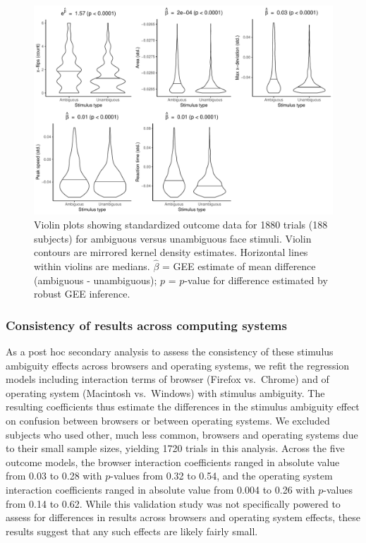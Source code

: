 \documentclass[]{article}
\begin{document}
\begin{figure}[H]
\centering
\includegraphics[width=150mm]{figures/violin_plots.pdf}
\caption{\label{fig:violin}Violin plots showing standardized outcome data for 1880 trials (188 subjects) for ambiguous versus unambiguous face stimuli. Violin contours are mirrored kernel density estimates. Horizontal lines within violins are medians. $\widehat{\beta}$ = GEE estimate of mean difference (ambiguous - unambiguous); $p$ = $p$-value for difference estimated by robust GEE inference.}
\end{figure}

\subsubsection{Consistency of results across computing systems}

As a post hoc secondary analysis to assess the consistency of these
stimulus ambiguity effects across browsers and operating systems, we
refit the regression models including interaction terms of browser
(Firefox vs.~Chrome) and of operating system (Macintosh vs.~Windows)
with stimulus ambiguity. The resulting coefficients thus estimate the
differences in the stimulus ambiguity effect on confusion between
browsers or between operating systems. We excluded subjects who used
other, much less common, browsers and operating systems due to their
small sample sizes, yielding 1720 trials in this analysis. Across the
five outcome models, the browser interaction coefficients ranged in
absolute value from 0.03 to 0.28 with \(p\)-values from 0.32 to 0.54,
and the operating system interaction coefficients ranged in absolute
value from 0.004 to 0.26 with \(p\)-values from 0.14 to 0.62. While this
validation study was not specifically powered to assess for differences
in results across browsers and operating system effects, these results
suggest that any such effects are likely fairly small.
\end{document}
